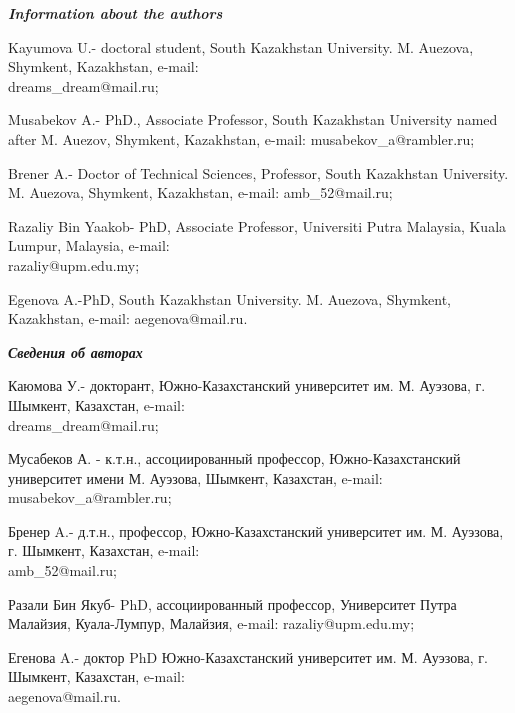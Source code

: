 \begin{authorinfo}
\hspace{1em}\emph{{\bfseries Information about the authors}}

Kayumova U.- doctoral student, South Kazakhstan University. M. Auezova,
Shymkent, Kazakhstan, e-mail: \\dreams\_dream@mail.ru;

Musabekov A.- PhD., Associate Professor, South Kazakhstan University
named after M. Auezov, Shymkent, Kazakhstan,
e-mail: musabekov\_a@rambler.ru;

Brener A.- Doctor of Technical Sciences, Professor, South Kazakhstan
University. M. Auezova, Shymkent, Kazakhstan, e-mail: amb\_52@mail.ru;

Razaliy Bin Yaakob- PhD, Associate Professor, Universiti Putra Malaysia,
Kuala Lumpur, Malaysia, e-mail: \\razaliy@upm.edu.my;

Egenova A.-PhD, South Kazakhstan University. M. Auezova, Shymkent,
Kazakhstan, e-mail: aegenova@mail.ru.

\hspace{1em}\emph{{\bfseries Сведения об авторах}}

Каюмова У.- докторант, Южно-Казахстанский университет им. М. Ауэзова, г.
Шымкент, Казахстан, e-mail: \\dreams\_dream@mail.ru;

Мусабеков А. - к.т.н., ассоциированный профессор, Южно-Казахстанский
университет имени М. Ауэзова, Шымкент, Казахстан, e-mail: musabekov\_a@rambler.ru;

Бренер A.- д.т.н., профессор, Южно-Казахстанский университет им. М.
Ауэзова, г. Шымкент, Казахстан, e-mail: \\amb\_52@mail.ru;

Разали Бин Якуб- PhD, ассоциированный профессор, Университет Путра
Малайзия, Куала-Лумпур, Малайзия, e-mail: razaliy@upm.edu.my;

Егенова A.- доктор PhD Южно-Казахстанский университет им. М. Ауэзова, г.
Шымкент, Казахстан, e-mail: \\aegenova@mail.ru.
\end{authorinfo}
